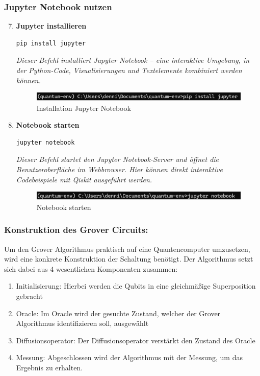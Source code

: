 \subsubsection*{Jupyter Notebook nutzen}

\begin{enumerate}
    \setcounter{enumi}{6} %
    \item \textbf{Jupyter installieren}
    \begin{verbatim}
pip install jupyter
    \end{verbatim}
\textit{Dieser Befehl installiert Jupyter Notebook -- eine interaktive Umgebung, in der Python-Code, Visualisierungen und Textelemente kombiniert werden können. }
    \begin{figure}
        \centering
        \includegraphics[width=1\linewidth]{Installation Jupyter Notebook.png}
        \caption{Installation Jupyter Notebook}
        \label{fig:enter-label}
    \end{figure}

    \item \textbf{Notebook starten}
    \begin{verbatim}
jupyter notebook
    \end{verbatim}
\textit{Dieser Befehl startet den Jupyter Notebook-Server und öffnet die Benutzeroberfläche im Webbrowser.  Hier können direkt interaktive Codebeispiele mit Qiskit ausgeführt werden. }
    \begin{figure}
        \centering
        \includegraphics[width=1\linewidth]{Notebook starten.png}
        \caption{Notebook starten}
        \label{fig:enter-label}
    \end{figure}
\end{enumerate}

\subsubsection{Konstruktion des Grover Circuits:}


Um den Grover Algorithmus praktisch auf eine Quantencomputer umzusetzen, wird eine konkrete Konstruktion der Schaltung benötigt. Der Algorithmus setzt sich dabei aus 4 wesentlichen Komponenten zusammen: 
\begin{enumerate}
    \item  Initialisierung: Hierbei werden die Qubits in eine gleichmäßige Superposition gebracht
    \item Oracle: Im Oracle wird der gesuchte Zustand, welcher der Grover Algorithmus identifizieren soll, ausgewählt
    \item Diffusionsoperator: Der Diffusionsoperator verstärkt den Zustand des Oracle
    \item   Messung: Abgeschlossen wird der Algorithmus mit der Messung, um das Ergebnis zu erhalten. 
\end{enumerate}

